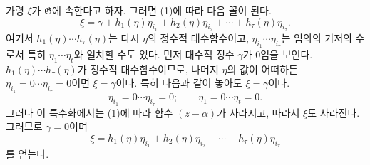 
가령 $\xi$가 $\mathfrak G$에 속한다고 하자. 그러면 (1)에 따라 다음 꼴이 된다.
\[
 \xi=\gamma+h_1(\eta)\eta_{i_1}+h_2(\eta)\eta_{i_2}
      +\cdots+h_\tau(\eta)\eta_{i_\tau}.
\]
여기서 $h_1(\eta)\cdots h_\tau(\eta)$는 다시 $\eta$의 정수적 대수함수이고, $\eta_{i_1}\cdots\eta_{i_\tau}$는 임의의 기저의 수로서 특히 $\eta_1\cdots\eta_t$와 일치할 수도 있다. 먼저 대수적 정수 $\gamma$가 $0$임을 보인다. $h_1(\eta)\cdots h_\tau(\eta)$가 정수적 대수함수이므로, 나머지 $\eta$의 값이 어떠하든 $\eta_{i_1}=0\cdots\eta_{i_\tau}=0$이면 $\xi=\gamma$이다. 특히 다음과 같이 놓아도 $\xi=\gamma$이다.
\[
 \eta_{i_1}=0\cdots \eta_{i_\tau}=0; \qquad
 \eta_1=0\cdots \eta_t=0.
\]
그러나 이 특수화에서는 (1)에 따라 함수 $(z-\alpha)$가 사라지고, 따라서 $\xi$도 사라진다. 그러므로 $\gamma=0$이며
\[
 \xi=h_1(\eta)\eta_{i_1}+h_2(\eta)\eta_{i_2}
      +\cdots+h_\tau(\eta)\eta_{i_\tau}
\]
를 얻는다.
